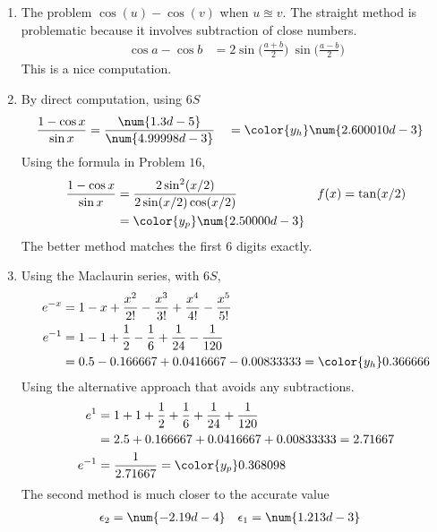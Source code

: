 \begin{enumerate}
    \item The problem $ \cos(u) - \cos(v) $ when $ u \approxeq v $. The straight method
          is problematic because it involves subtraction of close numbers.
          \begin{align}
              \cos a - \cos b & = 2\sin \Big( \frac{a + b}{2}\Big)
              \ \sin\Big( \frac{a-b}{2} \Big)
          \end{align}
          This is a nice computation.

    \item By direct computation, using $ 6S $
          \begin{align}
              \frac{1 - \cos x}{\sin x} & = \frac{\num{1.3d-5}}{\num{4.99998d-3}} &
                                        & = \color{y_h} \num{2.600010d-3}
          \end{align}
          Using the formula in Problem $ 16 $,
          \begin{align}
              \frac{1 - \cos x}{\sin x} & = \frac{2\sin^2(x/2)}{2\sin(x/2)\cos(x/2)} &
              f(x)                      & = \tan(x/2)                                  \\
                                        & = \color{y_p} \num{2.50000d-3}
          \end{align}
          The better method matches the first 6 digits exactly.

    \item Using the Maclaurin series, with $ 6S $,
          \begin{align}
              e^{-x} & = 1 - x + \frac{x^2}{2!} - \frac{x^3}{3!} + \frac{x^4}{4!}
              - \frac{x^5}{5!}                                                    \\
              e^{-1} & = 1 - 1 + \frac{1}{2} - \frac{1}{6} + \frac{1}{24}
              - \frac{1}{120}                                                     \\
                     & = 0.5 - 0.166667 + 0.0416667 - 0.00833333
              = \color{y_h} 0.366666
          \end{align}
          Using the alternative approach that avoids any subtractions.
          \begin{align}
              e^{1}  & = 1 + 1 + \frac{1}{2} + \frac{1}{6} + \frac{1}{24}
              + \frac{1}{120}                                              \\
                     & = 2.5 + 0.166667 + 0.0416667 + 0.00833333 = 2.71667 \\
              e^{-1} & = \frac{1}{2.71667} = \color{y_p} 0.368098
          \end{align}
          The second method is much closer to the accurate value
          \begin{align}
              \epsilon_2 & = \num{-2.19d-4} & \epsilon_1 & = \num{1.213d-3}
          \end{align}


\end{enumerate}

